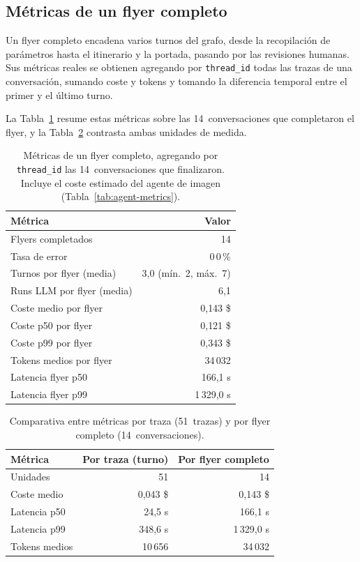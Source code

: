 \subsection{Métricas de un flyer completo}
\label{sec:flyer-completo}

Un flyer completo encadena varios turnos del grafo, desde la recopilación de parámetros hasta el itinerario y la portada, pasando por las revisiones humanas. Sus métricas reales se obtienen agregando por \texttt{thread\_id} todas las trazas de una conversación, sumando coste y tokens y tomando la diferencia temporal entre el primer y el último turno.

La Tabla~\ref{tab:flyer-completo} resume estas métricas sobre las 14~conversaciones que completaron el flyer, y la Tabla~\ref{tab:traza-vs-flyer} contrasta ambas unidades de medida.

\begin{table}[htbp]
\centering
\fontsize{10}{12}\selectfont
\begin{tabular}{lr}
\toprule
Métrica & Valor \\
\midrule
Flyers completados & 14 \\
Tasa de error & 0\,0\,\% \\
Turnos por flyer (media) & 3{,}0 (mín.\ 2, máx.\ 7) \\
Runs LLM por flyer (media) & 6{,}1 \\
Coste medio por flyer & 0{,}143 \$ \\
Coste p50 por flyer & 0{,}121 \$ \\
Coste p99 por flyer & 0{,}343 \$ \\
Tokens medios por flyer & 34\,032 \\
Latencia flyer p50 & 166{,}1 s \\
Latencia flyer p99 & 1\,329{,}0 s \\
\bottomrule
\end{tabular}
\caption{Métricas de un flyer completo, agregando por \texttt{thread\_id} las 14~conversaciones que finalizaron. Incluye el coste estimado del agente de imagen (Tabla~\ref{tab:agent-metrics}).}
\label{tab:flyer-completo}
\end{table}

\begin{table}[htbp]
\centering
\fontsize{10}{12}\selectfont
\begin{tabular}{lrr}
\toprule
Métrica & Por traza (turno) & Por flyer completo \\
\midrule
Unidades & 51 & 14 \\
Coste medio & 0{,}043 \$ & 0{,}143 \$ \\
Latencia p50 & 24{,}5 s & 166{,}1 s \\
Latencia p99 & 348{,}6 s & 1\,329{,}0 s \\
Tokens medios & 10\,656 & 34\,032 \\
\bottomrule
\end{tabular}
\caption{Comparativa entre métricas por traza (51~trazas) y por flyer completo (14~conversaciones).}
\label{tab:traza-vs-flyer}
\end{table}


